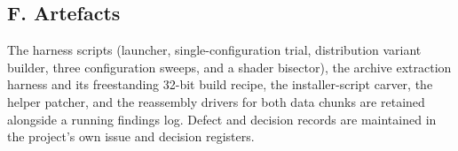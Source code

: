 \subsection*{F. Artefacts}

The harness scripts (launcher, single-configuration trial, distribution variant
builder, three configuration sweeps, and a shader bisector), the archive
extraction harness and its freestanding 32-bit build recipe, the installer-script
carver, the helper patcher, and the reassembly drivers for both data chunks are
retained alongside a running findings log. Defect and decision records are
maintained in the project's own issue and decision registers.
